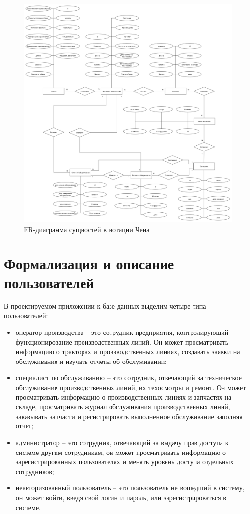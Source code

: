 \begin{figure}[H]
    \centering
    \includegraphics[width=1\textwidth]{inc/img/erchena}
    \caption{ER-диаграмма сущностей в нотации Чена}
    \label{img:er}
\end{figure}

\section{Формализация и описание пользователей}

В проектируемом приложении к базе данных выделим четыре типа пользователей:

\begin{itemize}[label=--]
    \item оператор производства -- это сотрудник предприятия, контролирующий функционирование производственных линий. Он может просматривать информацию о тракторах и производственных линиях, создавать заявки на обслуживание и изучать отчеты об обслуживании;
    \item специалист по обслуживанию -- это сотрудник, отвечающий за техническое обслуживание производственных линий, их техосмотры и ремонт. Он может просматривать информацию о производственных линиях и запчастях на складе, просматривать журнал обслуживания производственных линий, заказывать запчасти и регистрировать выполненное обслуживание заполняя отчет;
    \item администратор -- это сотрудник, отвечающий за выдачу прав доступа к системе другим сотрудникам, он может просматривать информацию о зарегистрированных пользователях и менять уровень доступа отдельных сотрудников;
    \item неавторизованный пользователь -- это пользователь не вошедший в систему, он может войти, введя свой логин и пароль, или зарегистрироваться в системе.
\end{itemize}

